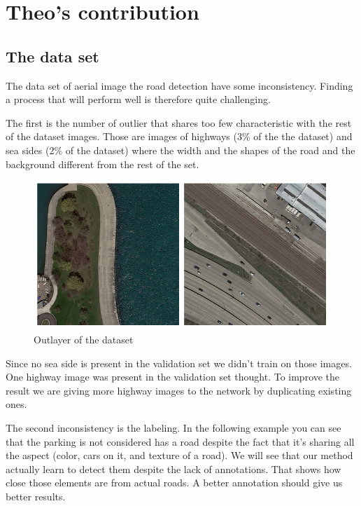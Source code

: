 \documentclass[10pt,conference,compsocconf]{IEEEtran}
\begin{document}
\clearpage
\section{Theo's contribution}

\subsection{The data set}

The data set of aerial image the road detection have some inconsistency. Finding a process that will perform well is therefore quite challenging.

The first is the number of outlier that shares too few characteristic with the rest of the dataset images. Those are images of highways (3\% of the the dataset) and sea sides (2\% of the dataset) where the width and the shapes of the road and the background different from the rest of the set.
\begin{figure}[h]
  \centering
  \includegraphics[width=\columnwidth]{img/outlayers.png}
  \caption{Outlayer of the dataset}
  \vspace{-3mm}
  \label{fig:outlayers}
\end{figure}

Since no sea side is present in the validation set we didn’t train on those images. One highway image was present in the validation set thought. To improve the result we are giving more highway images to the network by duplicating existing ones.

The second inconsistency is the labeling. In the following example you can see that the parking is not considered has a road despite the fact that it’s sharing all the aspect (color, cars on it, and texture of a road). We will see that our method actually learn to detect them despite the lack of annotations. That shows how close those elements are from actual roads. A better annotation should give us better results.
\end{document}
